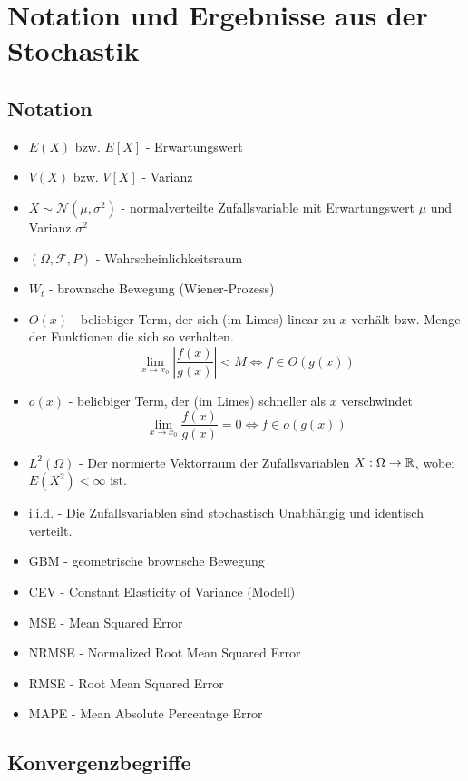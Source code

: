 \section{Notation und Ergebnisse aus der Stochastik}
\subsection{Notation}
\begin{itemize}
    \item $E(X)$ bzw. $E[X]$ - Erwartungswert
    \item $V(X)$ bzw. $V[X]$ - Varianz
    \item $X \sim \mathcal N(\mu, \sigma^2)$ - normalverteilte Zufallsvariable mit Erwartungswert $\mu$ und Varianz $\sigma^2$
    \item $(\Omega, \mathcal F, P)$ - Wahrscheinlichkeitsraum
    \item $W_t$ - brownsche Bewegung (Wiener-Prozess)
    \item $O(x)$ - beliebiger Term, der sich (im Limes) linear zu $x$ verhält bzw. Menge der Funktionen die sich so verhalten.
$$\lim_{x \to x_0} \left \vert \frac{f(x)}{g(x)} \right \vert  \lt M \iff f \in O(g(x))$$    
    \item $o(x)$ - beliebiger Term, der (im Limes) schneller als $x$ verschwindet
$$\lim_{x \to x_0} \frac{f(x)}{g(x)} = 0 \iff f \in o(g(x))$$    
    \item $L^2(\Omega)$ - Der normierte Vektorraum der Zufallsvariablen $X : \Omega \to \Bbb R$, wobei $E(X^2) \lt \infty$ ist.
    \item i.i.d. - Die Zufallsvariablen sind stochastisch Unabhängig und identisch verteilt.
    \item GBM - geometrische brownsche Bewegung
    \item CEV - Constant Elasticity of Variance (Modell)
    \item MSE - Mean Squared Error
    \item NRMSE - Normalized Root Mean Squared Error
    \item RMSE - Root Mean Squared Error
    \item MAPE - Mean Absolute Percentage Error
\end{itemize}

\subsection{Konvergenzbegriffe}

